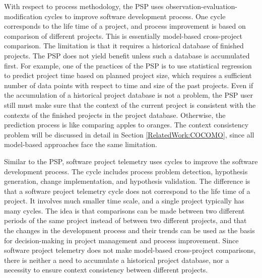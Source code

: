 With respect to process methodology, the PSP uses observation-evaluation-modification cycles to improve software development process. One cycle corresponds to the life time of a project, and process improvement is based on comparison of different projects. This is essentially model-based cross-project comparison. The limitation is that it requires a historical database of finished projects. The PSP does not yield benefit unless such a database is accumulated first. For example, one of the practices of the PSP is to use statistical regression to predict project time based on planned project size, which requires a sufficient number of data points with respect to time and size of the past projects. Even if the accumulation of a historical project database is not a problem, the PSP user still must make sure that the context of the current project is consistent with the contexts of the finished projects in the project database. Otherwise, the prediction process is like comparing apples to oranges. The context consistency problem will be discussed in detail in Section \ref{RelatedWork:COCOMO}, since all model-based approaches face the same limitation.

Similar to the PSP, software project telemetry uses cycles to improve the software development process. The cycle includes process problem detection, hypothesis generation, change implementation, and hypothesis validation. The difference is that a software project telemetry cycle does not correspond to the life time of a project. It involves much smaller time scale, and a single project typically has many cycles. The idea is that comparisons can be made between two different periods of the same project instead of between two different projects, and that the changes in the development process and their trends can be used as the basis for decision-making in project management and process improvement. Since software project telemetry does not make model-based cross-project comparisons, there is neither a need to accumulate a historical project database, nor a necessity to ensure context consistency between different projects.








